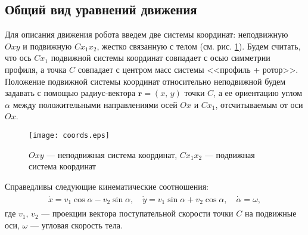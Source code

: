 	
	
	
	

\subsection{Общий вид уравнений движения}



Для описания движения робота введем две системы координат: неподвижную $Oxy$ и подвижную $Cx_1x_2$, жестко связанную с телом (см. рис. \ref{fig.coords}). Будем считать, что ось $Cx_1$ подвижной системы координат совпадает с осью симметрии профиля, а точка $C$ совпадает с центром масс системы <<профиль + ротор>>. Положение подвижной системы координат относительно неподвижной будем задавать с помощью радиус-вектора $\bm r = (x,\, y)$ точки $C$, а ее ориентацию углом $\alpha$ между положительными направлениями осей $Ox$ и $Cx_1$, отсчитываемым от оси $Ox$.

\begin{figure}[h!]
	\centering
	\texttt{[image: coords.eps]}
	\caption{$Oxy$ --- неподвижная система координат, $Cx_1x_2$ --- подвижная система координат}\label{fig.coords}
\end{figure}

Справедливы следующие кинематические соотношения:
\begin{gather}
\begin{gathered}
\dot{x} = v_1 \cos\alpha - v_2 \sin\alpha,\quad \dot{y} = v_1 \sin\alpha + v_2 \cos\alpha,\quad \dot{\alpha} = \omega,
\end{gathered}\label{eq.kinem}
\end{gather}
где $v_1$, $v_2$ --- проекции вектора поступательной скорости точки $C$ на подвижные оси, $\omega$ --- угловая скорость тела.

